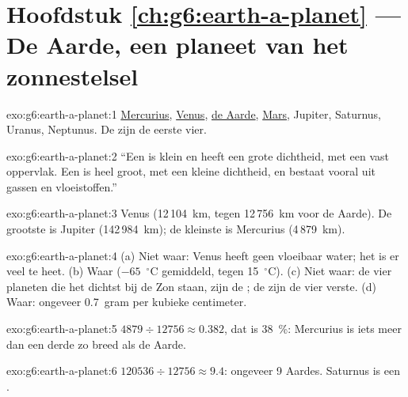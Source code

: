 \section*{Hoofdstuk \ref{ch:g6:earth-a-planet} --- De Aarde, een planeet van het zonnestelsel}

\begin{solution}{exo:g6:earth-a-planet:1}
\underline{Mercurius}, \underline{Venus}, \underline{de Aarde},
\underline{Mars}, Jupiter, Saturnus, Uranus, Neptunus. De  zijn
de eerste vier.
\end{solution}

\begin{solution}{exo:g6:earth-a-planet:2}
``Een  is klein en heeft een grote dichtheid, met een vast
oppervlak. Een  is heel groot, met een kleine dichtheid, en
bestaat vooral uit gassen en vloeistoffen.''
\end{solution}

\begin{solution}{exo:g6:earth-a-planet:3}
Venus (12\,104~km, tegen 12\,756~km voor de Aarde). De grootste is Jupiter
(142\,984~km); de kleinste is Mercurius (4\,879~km).
\end{solution}

\begin{solution}{exo:g6:earth-a-planet:4}
(a) Niet waar: Venus heeft geen vloeibaar water; het is er veel te heet.
(b) Waar ($-65$~$^\circ$C gemiddeld, tegen 15~$^\circ$C). (c) Niet waar: de
vier planeten die het dichtst bij de Zon staan, zijn de ; de
 zijn de vier verste. (d) Waar: ongeveer 0.7~gram per
kubieke centimeter.
\end{solution}

\begin{solution}{exo:g6:earth-a-planet:5}
$4879 \div 12756 \approx 0.382$, dat is 38~\%: Mercurius is iets meer dan
een derde zo breed als de Aarde.
\end{solution}

\begin{solution}{exo:g6:earth-a-planet:6}
$120536 \div 12756 \approx 9.4$: ongeveer 9 Aardes. Saturnus is een .
\end{solution}

